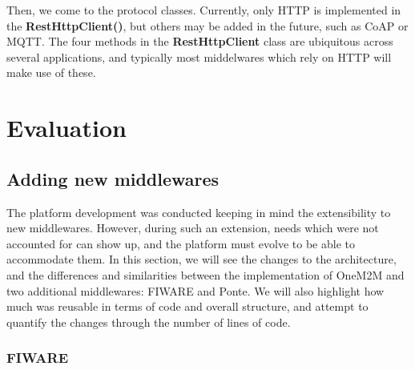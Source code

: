 \documentclass[conference]{IEEEtran}
\begin{document}
Then, we come to the protocol classes. Currently, only HTTP is implemented in the \textbf{RestHttpClient()}, but others may be added in the future, such as CoAP or MQTT\@. The four methods in the \textbf{RestHttpClient} class are ubiquitous across several applications, and typically most middelwares which rely on HTTP will make use of these. 

\section{Evaluation}

\subsection{Adding new middlewares}

The platform development was conducted keeping in mind the extensibility to new middlewares. 
However, during such an extension, needs which were not accounted for can show up, and the platform must evolve to be able to accommodate them. In this section, we will see the changes to the architecture, and the differences and similarities between the implementation of OneM2M and two additional middlewares: FIWARE and Ponte. We will also highlight how much was reusable in terms of code and overall structure, and attempt to quantify the changes through the number of lines of code. 

\subsubsection{FIWARE}
\end{document}
